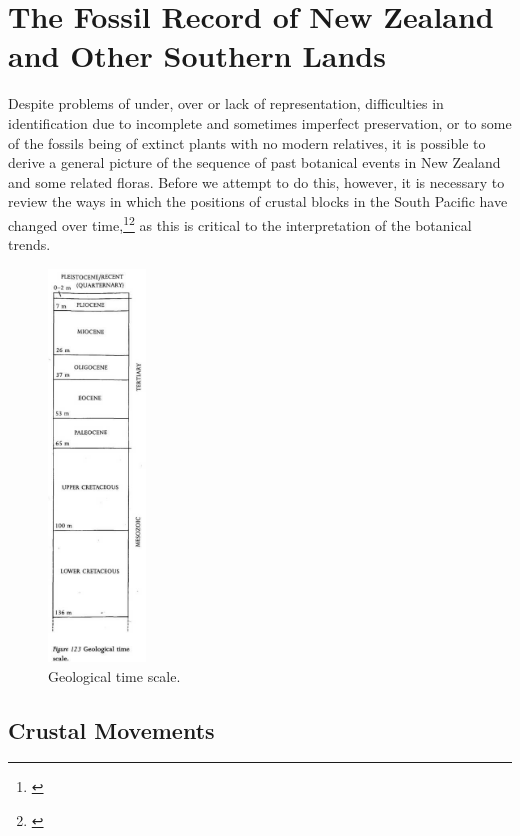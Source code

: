 \section{The Fossil Record of New Zealand and Other Southern Lands}

Despite problems of under, over or lack of representation, difficulties in identification due to incomplete and sometimes imperfect preservation, or to some of the fossils being of extinct plants with no modern relatives, it is possible to derive a general picture of the sequence of past botanical events in New Zealand and some related floras.
Before we attempt to do this, however, it is necessary to review the ways in which the positions of crustal blocks in the South Pacific have changed over time,\footnote{\cite{kemp1978tertiary}}\footnote{\cite{crook1981break}} as this is critical to the interpretation of the botanical trends.
\begin{figure}
	\centering
	\includegraphics[width=0.23\textwidth]{graphics/figure123timescale.jpg}
	\caption[Geological time scale]{Geological time scale.}%
	\label{fig:123timescale}
\end{figure}

\subsection{Crustal Movements}

